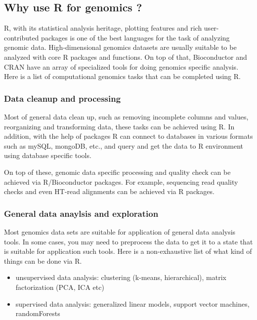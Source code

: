 \documentclass[12pt,]{krantz}
\providecommand{\tightlist}{%
  \setlength{\itemsep}{0pt}\setlength{\parskip}{0pt}}
\theoremstyle{definition}
\theoremstyle{definition}
\theoremstyle{definition}
\theoremstyle{remark}
\begin{document}
\hypertarget{why-use-r-for-genomics}{%
\subsection{Why use R for genomics ?}\label{why-use-r-for-genomics}}

R, with its statistical analysis heritage, plotting features and rich
user-contributed packages is one of the best languages for the task of
analyzing genomic data. High-dimensional genomics datasets are usually
suitable to be analyzed with core R packages and functions. On top of
that, Bioconductor and CRAN have an array of specialized tools for doing
genomics specific analysis. Here is a list of computational genomics
tasks that can be completed using R.

\hypertarget{data-cleanup-and-processing}{%
\subsubsection{Data cleanup and
processing}\label{data-cleanup-and-processing}}

Most of general data clean up, such as removing incomplete columns and
values, reorganizing and transforming data, these tasks can be achieved
using R. In addition, with the help of packages R can connect to
databases in various formats such as mySQL, mongoDB, etc., and query and
get the data to R environment using database specific tools.

On top of these, genomic data specific processing and quality check can
be achieved via R/Bioconductor packages. For example, sequencing read
quality checks and even HT-read alignments can be achieved via R
packages.

\hypertarget{general-data-anaylsis-and-exploration}{%
\subsubsection{General data anaylsis and
exploration}\label{general-data-anaylsis-and-exploration}}

Most genomics data sets are suitable for application of general data
analysis tools. In some cases, you may need to preprocess the data to
get it to a state that is suitable for application such tools. Here is a
non-exhaustive list of what kind of things can be done via R.

\begin{itemize}
\tightlist
\item
  unsupervised data analysis: clustering (k-means, hierarchical), matrix
  factorization (PCA, ICA etc)
\item
  supervised data analysis: generalized linear models, support vector
  machines, randomForests
\end{itemize}
\end{document}
